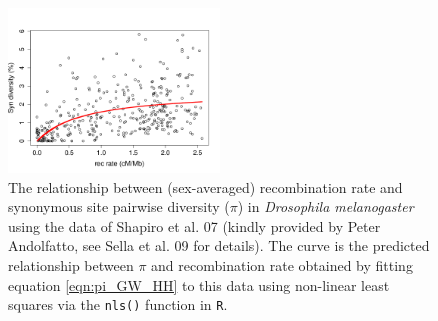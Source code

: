 \begin{figure}
\begin{center}
\includegraphics[width=0.5\textwidth]{figures/Genomewide_HH.png}
\end{center}
\caption{The relationship between (sex-averaged) recombination rate and synonymous
  site pairwise diversity ($\pi$) in {\it Drosophila melanogaster}
  using the data of Shapiro et al. 07 (kindly provided by Peter
  Andolfatto, see Sella et al. 09 for details). The curve is the
  predicted relationship between $\pi$ and recombination rate obtained
  by fitting equation \eqref{eqn:pi_GW_HH} to this data 
 using non-linear least squares via the {\tt nls()} function in {\tt R}.} \label{fig:GW_hitchhiking_reduction}
\end{figure}




